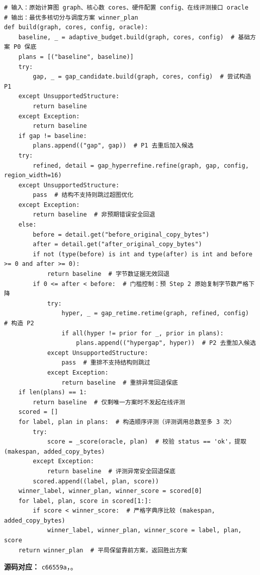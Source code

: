 \documentclass[anonymous,withtoc]{gmcm2026}
\renewcommand{\thealgorithm}{\thesection-\arabic{algorithm}}
\begin{document}
\FloatBarrier
\par{}\begingroup\normalsize
\captionsetup{type=algorithm,position=top,justification=raggedright,singlelinecheck=false,labelfont=bf}
\label{alg:p2-adaptive-hypergap}
\nopagebreak
\begin{tcolorbox}[enhanced,breakable,colback=white,colframe=black,
  boxrule=0pt,toprule=.4pt,bottomrule=.4pt,sharp corners,boxsep=0pt,
  left=0pt,right=0pt,top=4pt,bottom=4pt,before skip=2pt,after skip=2pt,
  title after break={算法~\thealgorithm（续）},
  colbacktitle=white,coltitle=black,fonttitle=\normalsize\bfseries]


\begin{lstlisting}[style=paperpseudo]
# 输入：原始计算图 graph、核心数 cores、硬件配置 config、在线评测接口 oracle
# 输出：最优多核切分与调度方案 winner_plan
def build(graph, cores, config, oracle):
    baseline, _ = adaptive_budget.build(graph, cores, config)  # 基础方案 P0 保底
    plans = [("baseline", baseline)]
    try:
        gap, _ = gap_candidate.build(graph, cores, config)  # 尝试构造 P1
    except UnsupportedStructure:
        return baseline
    except Exception:
        return baseline
    if gap != baseline:
        plans.append(("gap", gap))  # P1 去重后加入候选
    try:
        refined, detail = gap_hyperrefine.refine(graph, gap, config, region_width=16)
    except UnsupportedStructure:
        pass  # 结构不支持则跳过超图优化
    except Exception:
        return baseline  # 非预期错误安全回退
    else:
        before = detail.get("before_original_copy_bytes")
        after = detail.get("after_original_copy_bytes")
        if not (type(before) is int and type(after) is int and before >= 0 and after >= 0):
            return baseline  # 字节数证据无效回退
        if 0 <= after < before:  # 门槛控制：预 Step 2 原始复制字节数严格下降
            try:
                hyper, _ = gap_retime.retime(graph, refined, config)  # 构造 P2
                if all(hyper != prior for _, prior in plans):
                    plans.append(("hypergap", hyper))  # P2 去重加入候选
            except UnsupportedStructure:
                pass  # 重排不支持结构则跳过
            except Exception:
                return baseline  # 重排异常回退保底
    if len(plans) == 1:
        return baseline  # 仅剩唯一方案时不发起在线评测
    scored = []
    for label, plan in plans:  # 构造顺序评测（评测调用总数至多 3 次）
        try:
            score = _score(oracle, plan)  # 校验 status == 'ok'，提取 (makespan, added_copy_bytes)
        except Exception:
            return baseline  # 评测异常安全回退保底
        scored.append((label, plan, score))
    winner_label, winner_plan, winner_score = scored[0]
    for label, plan, score in scored[1:]:
        if score < winner_score:  # 严格字典序比较 (makespan, added_copy_bytes)
            winner_label, winner_plan, winner_score = label, plan, score
    return winner_plan  # 平局保留靠前方案，返回胜出方案
\end{lstlisting}
\textbf{源码对应：} \texttt{c66559a}，\texttt{}。

\end{tcolorbox}\endgroup
\end{document}
